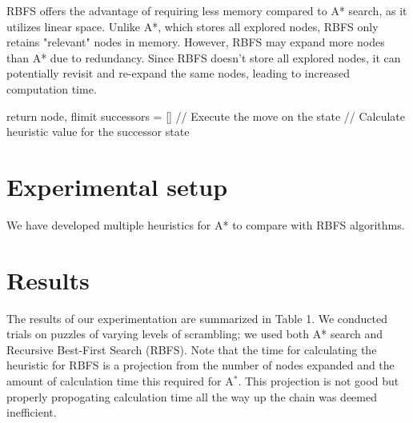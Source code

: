 \documentclass{article}
\begin{document}
RBFS offers the advantage of requiring less memory compared to A* search, as it utilizes linear space. Unlike A*, which stores all explored nodes, RBFS only retains "relevant" nodes in memory. However, RBFS may expand more nodes than A* due to redundancy. Since RBFS doesn't store all explored nodes, it can potentially revisit and re-expand the same nodes, leading to increased computation time.
\begin{algorithm}
   
  \State return node, flimit
        \EndIf
        \State successors = []
             // Execute the move on the state
             // Calculate heuristic value for the successor state
            \EndIf
            \EndFor
        \EndIf

            \EndIf
            \EndIf
            \EndWhile
  \label{alg:RBFS}
\end{algorithm}

\section{Experimental setup}

We have developed multiple heuristics for A* to compare with RBFS algorithms.  


\section{Results}

The results of our experimentation are summarized in Table 1. We conducted trials on puzzles of varying levels of scrambling; we used both A* search and Recursive Best-First Search (RBFS). Note that the time for calculating the heuristic for RBFS is a projection from the number of nodes expanded and the amount of calculation time this required for A$^*$. This projection is not good but properly propogating calculation time all the way up the chain was deemed inefficient. 
\end{document}
